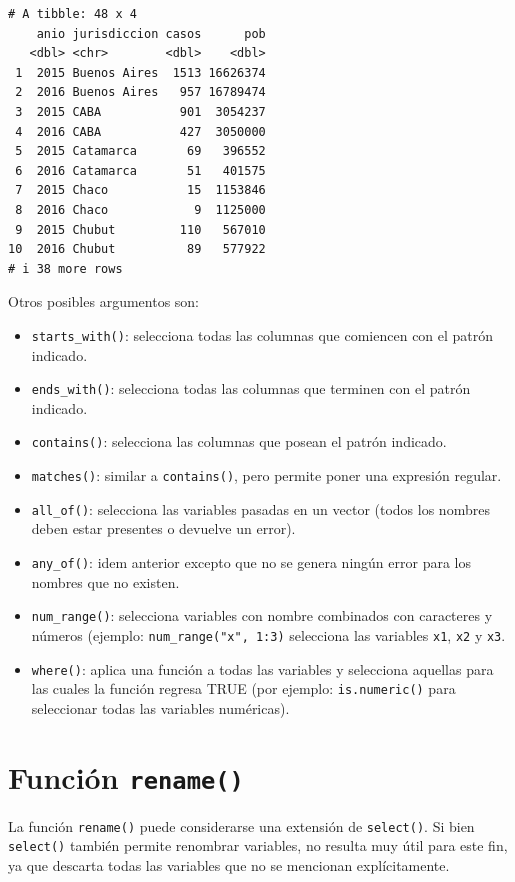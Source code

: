 \documentclass[
  spanish,
  a4paper,
]{scrbook}
\begin{document}
\begin{verbatim}
# A tibble: 48 x 4
    anio jurisdiccion casos      pob
   <dbl> <chr>        <dbl>    <dbl>
 1  2015 Buenos Aires  1513 16626374
 2  2016 Buenos Aires   957 16789474
 3  2015 CABA           901  3054237
 4  2016 CABA           427  3050000
 5  2015 Catamarca       69   396552
 6  2016 Catamarca       51   401575
 7  2015 Chaco           15  1153846
 8  2016 Chaco            9  1125000
 9  2015 Chubut         110   567010
10  2016 Chubut          89   577922
# i 38 more rows
\end{verbatim}

Otros posibles argumentos son:

\begin{itemize}
\item
  \texttt{starts\_with()}: selecciona todas las columnas que comiencen
  con el patrón indicado.
\item
  \texttt{ends\_with()}: selecciona todas las columnas que terminen con
  el patrón indicado.
\item
  \texttt{contains()}: selecciona las columnas que posean el patrón
  indicado.
\item
  \texttt{matches()}: similar a \texttt{contains()}, pero permite poner
  una expresión regular.
\item
  \texttt{all\_of()}: selecciona las variables pasadas en un vector
  (todos los nombres deben estar presentes o devuelve un error).
\item
  \texttt{any\_of()}: idem anterior excepto que no se genera ningún
  error para los nombres que no existen.
\item
  \texttt{num\_range()}: selecciona variables con nombre combinados con
  caracteres y números (ejemplo: \texttt{num\_range("x",\ 1:3)}
  selecciona las variables \texttt{x1}, \texttt{x2} y \texttt{x3}.
\item
  \texttt{where()}: aplica una función a todas las variables y
  selecciona aquellas para las cuales la función regresa TRUE (por
  ejemplo: \texttt{is.numeric()} para seleccionar todas las variables
  numéricas).
\end{itemize}

\section{\texorpdfstring{Función
\texttt{rename()}}{Función rename()}}\label{funciuxf3n-rename}

La función \texttt{rename()} puede considerarse una extensión de
\texttt{select()}. Si bien \texttt{select()} también permite renombrar
variables, no resulta muy útil para este fin, ya que descarta todas las
variables que no se mencionan explícitamente.
\end{document}
